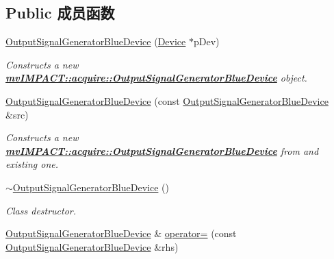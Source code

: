 \subsection*{Public 成员函数}
\begin{DoxyCompactItemize}
\item 
\hyperlink{classmv_i_m_p_a_c_t_1_1acquire_1_1_output_signal_generator_blue_device_a7d6ab619d350994da9d2bf43b0994ba5}{Output\+Signal\+Generator\+Blue\+Device} (\hyperlink{classmv_i_m_p_a_c_t_1_1acquire_1_1_device}{Device} $\ast$p\+Dev)
\begin{DoxyCompactList}\small\item\em Constructs a new {\bfseries \hyperlink{classmv_i_m_p_a_c_t_1_1acquire_1_1_output_signal_generator_blue_device}{mv\+I\+M\+P\+A\+C\+T\+::acquire\+::\+Output\+Signal\+Generator\+Blue\+Device}} object. \end{DoxyCompactList}\item 
\hyperlink{classmv_i_m_p_a_c_t_1_1acquire_1_1_output_signal_generator_blue_device_af306363929548de026a50ca6154d0ed1}{Output\+Signal\+Generator\+Blue\+Device} (const \hyperlink{classmv_i_m_p_a_c_t_1_1acquire_1_1_output_signal_generator_blue_device}{Output\+Signal\+Generator\+Blue\+Device} \&src)
\begin{DoxyCompactList}\small\item\em Constructs a new {\bfseries \hyperlink{classmv_i_m_p_a_c_t_1_1acquire_1_1_output_signal_generator_blue_device}{mv\+I\+M\+P\+A\+C\+T\+::acquire\+::\+Output\+Signal\+Generator\+Blue\+Device}} from and existing one. \end{DoxyCompactList}\item 
\hypertarget{classmv_i_m_p_a_c_t_1_1acquire_1_1_output_signal_generator_blue_device_ae0a88583200d07666123da6f377039fe}{\hyperlink{classmv_i_m_p_a_c_t_1_1acquire_1_1_output_signal_generator_blue_device_ae0a88583200d07666123da6f377039fe}{$\sim$\+Output\+Signal\+Generator\+Blue\+Device} ()}\label{classmv_i_m_p_a_c_t_1_1acquire_1_1_output_signal_generator_blue_device_ae0a88583200d07666123da6f377039fe}

\begin{DoxyCompactList}\small\item\em Class destructor. \end{DoxyCompactList}\item 
\hypertarget{classmv_i_m_p_a_c_t_1_1acquire_1_1_output_signal_generator_blue_device_ab47b618c2dede6a6aee6fe92ffdc6b5c}{\hyperlink{classmv_i_m_p_a_c_t_1_1acquire_1_1_output_signal_generator_blue_device}{Output\+Signal\+Generator\+Blue\+Device} \& \hyperlink{classmv_i_m_p_a_c_t_1_1acquire_1_1_output_signal_generator_blue_device_ab47b618c2dede6a6aee6fe92ffdc6b5c}{operator=} (const \hyperlink{classmv_i_m_p_a_c_t_1_1acquire_1_1_output_signal_generator_blue_device}{Output\+Signal\+Generator\+Blue\+Device} \&rhs)}\label{classmv_i_m_p_a_c_t_1_1acquire_1_1_output_signal_generator_blue_device_ab47b618c2dede6a6aee6fe92ffdc6b5c}


\end{DoxyCompactItemize}

